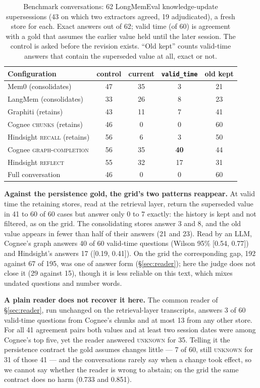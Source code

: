\documentclass[conference]{IEEEtran}
\begin{document}
\begin{table}[t]
\centering
\caption{Benchmark conversations: 62 LongMemEval knowledge-update supersessions
(43 on which two extractors agreed, 19 adjudicated), a fresh store for each.
Exact answers out of 62; valid time (of 60) is agreement with a gold that
assumes the earlier value held until the later session. The control
is asked before the revision exists. ``Old kept'' counts valid-time answers
that contain the superseded value at all, exact or not.}
\label{tab:realdata}
\footnotesize
\setlength{\tabcolsep}{3.5pt}
\begin{tabular}{@{}lcccc@{}}
\toprule
Configuration & control & current & \texttt{valid\_time} & old kept \\
\midrule
Mem0 (consolidates)                 & 47 & 35 & 3  & 21 \\
LangMem (consolidates)              & 33 & 26 & 8  & 23 \\
Graphiti (retains)                  & 43 & 11 & 7  & 41 \\
Cognee \textsc{chunks} (retains)    & 46 & 0  & 0  & 60 \\
Hindsight \textsc{recall} (retains) & 56 & 6  & 3  & 50 \\
\midrule
Cognee \textsc{graph-completion}    & 56 & 35 & \textbf{40} & 44 \\
Hindsight \textsc{reflect}          & 55 & 32 & 17 & 31 \\
\midrule
Full conversation                   & 46 & 0  & 0  & 60 \\
\bottomrule
\end{tabular}
\end{table}

\textbf{Against the persistence gold, the grid's two patterns reappear.} At valid time the retaining
stores, read at the retrieval layer, return the superseded value in 41 to 60 of
60 cases but answer only 0 to 7 exactly: the history is kept and not filtered,
as on the grid. The consolidating stores answer 3 and 8, and the old value
appears in fewer than half of their answers (21 and 23). Read by an
LLM, Cognee's graph answers 40 of 60 valid-time questions (Wilson 95\%
[0.54, 0.77]) and Hindsight's answers 17 ([0.19, 0.41]). On the grid the
corresponding gap, 192 against 67 of 195, was one of answer form
(\S\ref{sec:reader}); here the judge does not close it (29 against 15), though
it is less reliable on this text, which mixes undated questions and number
words.

\textbf{A plain reader does not recover it here.} The common reader of
\S\ref{sec:reader}, run unchanged on the retrieval-layer transcripts, answers 3
of 60 valid-time questions from Cognee's chunks and at most 13 from any other
store. For all 41 agreement pairs both values and at least two session dates
were among Cognee's top five, yet the reader answered \textsc{unknown} for 35.
Telling it the persistence contract the gold assumes changes little --- 7 of 60,
still \textsc{unknown} for 31 of those 41 --- and the conversations rarely say
when a change took effect, so we cannot say whether the reader is wrong to
abstain; on the grid the same contract does no harm (0.733 and 0.851).
\end{document}
